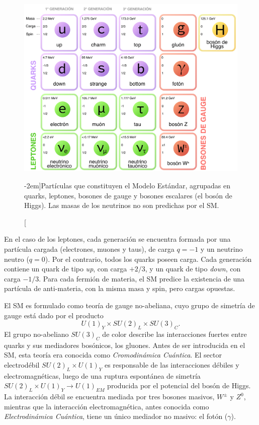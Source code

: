 \begin{figure}[t]
  \includegraphics[width=\linewidth]{Assets/Images/Standard_model.pdf}
  \caption[Partículas que constituyen el Modelo Estándar][-2em]{Partículas que constituyen el Modelo Estándar, agrupadas en quarks, leptones, bosones de gauge y bosones escalares (el bosón de Higgs). Las masas de los neutrinos no son predichas por el SM.}
  \label{fig:ch1:SM:particles}
\end{figure}

En el caso de los leptones, cada generación se encuentra formada por una partícula cargada (electrones, muones y taus), de carga $q = -1$ y un neutrino neutro ($q = 0$). Por el contrario, todos los quarks poseen carga. Cada generación contiene un quark de tipo \textit{up}, con carga $+2/3$, y un quark de tipo \textit{down}, con carga $-1/3$. Para cada fermión de materia, el SM predice la existencia de una partícula de anti-materia, con la misma masa y spin, pero cargas opuestas.

El SM es formulado como teoría de gauge no-abeliana, cuyo grupo de simetría de gauge está dado por el producto
\[ U(1)_Y \times SU(2)_L \times SU(3)_C. \]
El grupo no-abeliano $SU(3)_C$ de color describe las interacciones fuertes entre quarks y sus mediadores bosónicos, los gluones. Antes de ser introducida en el SM, esta teoría era conocida como \textit{Cromodinámica Cuántica}. El sector electrodébil $SU(2)_L \times U(1)_Y$ es responsable de las interacciones débiles y electromagnéticas, luego de una ruptura espontánea de simetría $SU(2)_L \times U(1)_Y \to U(1)_{EM}$ producida por el potencial del bosón de Higgs. La interacción débil se encuentra mediada por tres bosones masivos, $W^\pm$ y $Z^0$, mientras que la interacción electromagnética, antes conocida como \textit{Electrodinámica Cuántica}, tiene un único mediador no masivo: el fotón ($\gamma$).

